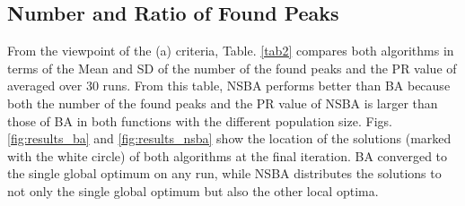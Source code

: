 \documentclass{ies2018}
\begin{document}
\subsection{Number and Ratio of Found Peaks}
From the viewpoint of the (a) criteria, Table. \ref{tab2} compares both algorithms in terms of the Mean and SD of the number of the found peaks and the PR value of averaged over 30 runs. From this table, NSBA performs better than BA because both the number of the found peaks and the PR value of NSBA is larger than those of BA in both functions with the different population size. Figs. \ref{fig:results_ba} and \ref{fig:results_nsba} show the location of the solutions (marked with the white circle) of both algorithms at the final iteration. BA converged to the single global optimum on any run, while NSBA distributes the solutions to not only the single global optimum but also the other local optima.
\end{document}
